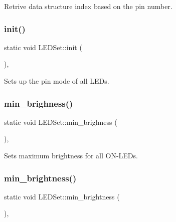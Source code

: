 Retrive data structure index based on the pin number. 

\mbox{\label{classLEDSet_aebc268353f21afffcf0a80c92b6444d2}} 
\subsubsection{\texorpdfstring{init()}{init()}}
{\footnotesize\ttfamily static void L\+E\+D\+Set\+::init (\begin{DoxyParamCaption}{ }\end{DoxyParamCaption})\hspace{0.3cm}{\ttfamily [inline]}, {\ttfamily [static]}}



Sets up the pin mode of all L\+E\+Ds. 

\mbox{\label{classLEDSet_a3e97e2ccf25adfa7f5f752138e616c96}} 
\subsubsection{\texorpdfstring{min\+\_\+brighness()}{min\_brighness()}}
{\footnotesize\ttfamily static void L\+E\+D\+Set\+::min\+\_\+brighness (\begin{DoxyParamCaption}{ }\end{DoxyParamCaption})\hspace{0.3cm}{\ttfamily [inline]}, {\ttfamily [static]}}



Sets maximum brightness for all O\+N-\/\+L\+E\+Ds. 

\mbox{\label{classLEDSet_a27796646d2977615e6c040db6417a4f5}} 
\subsubsection{\texorpdfstring{min\+\_\+brightness()}{min\_brightness()}}
{\footnotesize\ttfamily static void L\+E\+D\+Set\+::min\+\_\+brightness (\begin{DoxyParamCaption}{ }\end{DoxyParamCaption})\hspace{0.3cm}{\ttfamily [inline]}, {\ttfamily [static]}}

